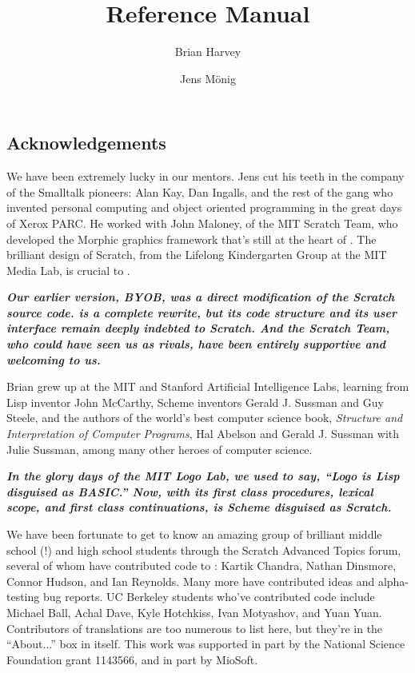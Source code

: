 \documentclass{report}
\begin{document}
\title{\Snap{} Reference Manual}
\author{Brian Harvey \and Jens M\"{o}nig}
\date{}

\maketitle

\tableofcontents

\chapter*{}
\section*{Acknowledgements}

We have been extremely lucky in our mentors. Jens cut his teeth in the company of the Smalltalk pioneers: Alan Kay, Dan Ingalls, and the rest of the gang who invented personal computing and object oriented programming in the great days of Xerox PARC. He worked with John Maloney, of the MIT Scratch Team, who developed the Morphic graphics framework that's still at the heart of \Snap{}. The brilliant design of Scratch, from the Lifelong Kindergarten Group at the MIT Media Lab, is crucial to \Snap{}.

\textbf{\emph{Our earlier version, BYOB, was a direct modification of the Scratch source code. \Snap{} is a complete rewrite, but its code structure and its user interface remain deeply indebted to Scratch. And the Scratch Team, who could have seen us as rivals, have been entirely supportive and welcoming to us.}}

Brian grew up at the MIT and Stanford Artificial Intelligence Labs, learning from Lisp inventor John McCarthy, Scheme inventors Gerald J. Sussman and Guy Steele, and the authors of the world's best computer science book, \textit{Structure and Interpretation of Computer Programs}, Hal Abelson and Gerald J. Sussman with Julie Sussman, among many other heroes of computer science.

\textbf{\emph{In the glory days of the MIT Logo Lab, we used to say, ``Logo is Lisp disguised as BASIC.'' Now, with its first class procedures, lexical scope, and first class continuations, \Snap{} is Scheme disguised as Scratch.}}

We have been fortunate to get to know an amazing group of brilliant middle school (!\@) and high school students through the Scratch Advanced Topics forum, several of whom have contributed code to \Snap{}: Kartik Chandra, Nathan Dinsmore, Connor Hudson, and Ian Reynolds. Many more have contributed ideas and alpha-testing bug reports. UC Berkeley students who've contributed code include Michael Ball, Achal Dave, Kyle Hotchkiss, Ivan Motyashov, and Yuan Yuan. Contributors of translations are too numerous to list here, but they're in the ``About...'' box in \Snap{} itself. This work was supported in part by the National Science Foundation grant 1143566, and in part by MioSoft.
\end{document}

